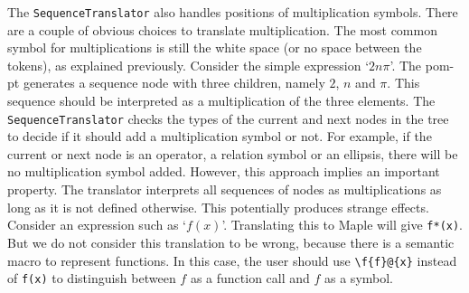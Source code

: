 \documentclass[a4paper,11pt]{article}
\newcommand{\Maple}{Maple}
\theoremstyle{defTheoStyle}
\theoremstyle{defExampStyle}
\begin{document}
	The \verb|SequenceTranslator| also handles positions of multiplication symbols. There are a couple of obvious choices to translate multiplication. The most common symbol for multiplications is still the white space (or no space between the tokens), as explained previously. Consider the simple expression `$2n\pi$'. The \gls*{pom-pt} generates a sequence node with three children, namely $2$, $n$ and $\pi$. This sequence should be interpreted as a multiplication of the three elements. The \verb|SequenceTranslator| checks the types of the current and next nodes in the tree to decide if it should add a multiplication symbol or not. For example, if the current or next node is an operator, a relation symbol or an ellipsis, there will be no multiplication symbol added. However, this approach implies an important property. The translator interprets all sequences of nodes as multiplications as long as it is not defined otherwise. This potentially produces strange effects. Consider an expression such as `$f(x)$'. Translating this to \Maple{} will give \verb|f*(x)|. But we do not consider this translation to be wrong, because there is a semantic macro to represent functions. In this case, the user should use \verb|\f{f}@{x}| instead of \verb|f(x)| to distinguish between $f$ as a function call and $f$ as a symbol.
	
\end{document}
